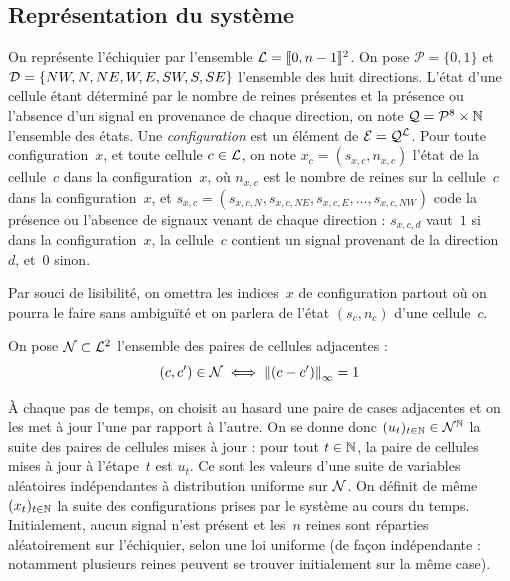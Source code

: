\subsection{Représentation du système}

\noindent
On représente l'échiquier par l'ensemble $\mathcal{L} = [\kern-0.15em [ 0, n-1]\kern-0.15em]^2$. On pose
$\mathcal{P} = \{0,1\}$ et \linebreak $\mathcal{D} = \{NW,N,NE,W,E,SW,S,SE\}$ l'ensemble des huit directions. L'état d'une cellule étant déterminé par le nombre de reines présentes et la présence ou l'absence d'un signal en provenance de chaque direction, on note $\mathcal{Q} = {\mathcal{P}^8}\times\mathbb{N}$ l'ensemble des états. Une \emph{configuration} est un élément de $\mathcal{E}=\mathcal{Q}^{\mathcal{L}}$. Pour toute configuration~$x$, et toute cellule $c \in \mathcal{L}$, on note $x_c = (s_{x, c}, n_{x, c})$ l'état de la cellule~$c$ dans la configuration~$x$, où $n_{x,c}$ est le nombre de reines sur la cellule~$c$ dans la configuration~$x$, et $s_{x,c} = (s_{x,c,N}, s_{x,c,NE}, s_{x,c,E}, \ldots, s_{x,c,NW})$ code la présence ou l'absence de signaux venant de chaque direction : $s_{x,c,d}$ vaut~$1$ si dans la configuration~$x$, la cellule~$c$ contient un signal provenant de la direction~$d$, et~$0$ sinon.


Par souci de lisibilité, on omettra les indices~$x$ de configuration partout où on pourra le faire sans ambiguïté et on parlera de l'état $(s_c, n_c)$ d'une cellule~$c$.

On pose $\mathcal{N} \subset \mathcal{L}^2$ l'ensemble des paires de cellules adjacentes : $$(c, c') \in \mathcal{N} \iff \left\lVert(c-c')\right\rVert_\infty = 1$$

À chaque pas de temps, on choisit au hasard une paire de cases adjacentes et on les met à jour l'une par rapport à l'autre.
On se donne donc $(u_t)_{t\in\mathbb{N}} \in \mathcal{N}^{\mathbb{N}}$ la suite des paires de cellules mises à jour : pour tout $t\in\mathbb{N}$, la paire de cellules mises à jour à l'étape~$t$ est $u_t$. Ce sont les valeurs d'une suite de variables aléatoires indépendantes à distribution uniforme sur $\mathcal{N}$. On définit de même $(x_t)_{t\in\mathbb{N}}$ la suite des configurations prises par le système au cours du temps. Initialement, aucun signal n'est présent et les~$n$ reines sont réparties aléatoirement sur l'échiquier, selon une loi uniforme (de façon indépendante : notamment plusieurs reines peuvent se trouver initialement sur la même case). 

